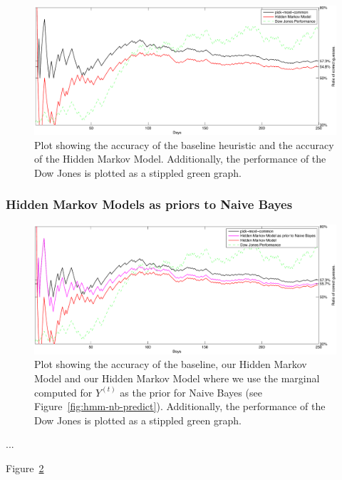 \documentclass[10pt, twocolumn]{article}
\begin{document}
\begin{figure}
\center
\hspace{0.5cm}
\includegraphics[width=16cm]{experiments/hmm_experiment.pdf}
\caption{Plot showing the accuracy of the baseline heuristic and the accuracy of the Hidden Markov Model. Additionally, the performance of the Dow Jones is plotted as a stippled green graph.}
\label{fig:hmm-experiment}
\end{figure}


\subsubsection{Hidden Markov Models as priors to Naive Bayes}

\begin{figure}
\center
\hspace{0.5cm}
\includegraphics[width=16cm]{experiments/hmm_nb.pdf}
\caption{Plot showing the accuracy of the baseline, our Hidden Markov Model and our Hidden Markov Model where we use the marginal computed for $Y^{(t)}$ as the prior for Naive Bayes (see Figure~\ref{fig:hmm-nb-predict}). Additionally, the performance of the Dow Jones is plotted as a stippled green graph.}
\label{fig:hmm-nb-experiment}
\end{figure}

...

Figure~\ref{fig:hmm-nb-experiment}
\end{document}
